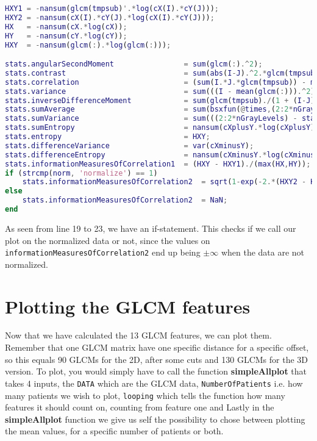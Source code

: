 \begin{lstlisting}[language=Matlab]
HXY1 = -nansum(glcm(tmpsub)'.*log(cX(I).*cY(J)));
HXY2 = -nansum(cX(I).*cY(J).*log(cX(I).*cY(J)));
HX   = -nansum(cX.*log(cX));
HY   = -nansum(cY.*log(cY));
HXY  = -nansum(glcm(:).*log(glcm(:)));

stats.angularSecondMoment                = sum(glcm(:).^2);
stats.contrast                           = sum(abs(I-J).^2.*glcm(tmpsub));
stats.correlation                        = (sum(I.*J.*glcm(tmpsub)) - muX*muY) ./ (stdX*stdY);
stats.variance                           = sum(((I - mean(glcm(:))).^2).*glcm(tmpsub));
stats.inverseDifferenceMoment            = sum(glcm(tmpsub)./(1 + (I-J).^2));
stats.sumAverage                         = sum(bsxfun(@times,(2:2*nGrayLevels)',cXplusY));
stats.sumVariance                        = sum(((2:2*nGrayLevels) - stats.sumAverage)'.^2.*cXplusY((2:2*nGrayLevels)-1,1));
stats.sumEntropy                         = nansum(cXplusY.*log(cXplusY));
stats.entropy                            = HXY;
stats.differenceVariance                 = var(cXminusY);
stats.differenceEntropy                  = nansum(cXminusY.*log(cXminusY));
stats.informationMeasuresOfCorrelation1  = (HXY - HXY1)./(max(HX,HY));
if (strcmp(norm, 'normalize') == 1)
    stats.informationMeasuresOfCorrelation2  = sqrt(1-exp(-2.*(HXY2 - HXY)));
else
    stats.informationMeasuresOfCorrelation2  = NaN;
end
\end{lstlisting}


As seen from line 19 to 23, we have an if-statement. This checks if we call our plot on the normalized data or not, since the values on \texttt{informationMeasuresOfCorrelation2} end up being $\pm \infty$ when the data are not normalized. 


\section{Plotting the GLCM features}
Now that we have calculated the 13 GLCM features, we can plot them. Remember that one GLCM matrix have one specific distance for a specific offset, so this equals 90 GLCMs for the 2D, after some cuts and 130 GLCMs for the 3D version. To plot, you would simply have to call the function \textbf{simpleAllplot} that takes 4 inputs, the \texttt{DATA} which are the GLCM data, \texttt{NumberOfPatients} i.e. how many patients we wish to plot, \texttt{looping} which tells the function how many features it should count on, counting from feature one and Lastly in the \textbf{simpleAllplot} function we give us self the possibility to chose between plotting the mean values, for a specific number of patients or both.

